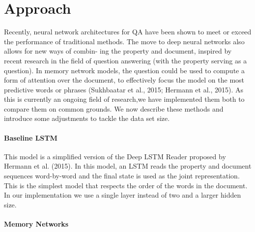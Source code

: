 \documentclass{article}
\begin{document}
\section{Approach}
\label{approach}

Recently, neural network architectures for QA have  been  shown  to  meet  or  exceed  the  performance of traditional methods. The  move  to  deep  neural
networks  also  allows  for  new  ways  of  combin-
ing the property and document, inspired by recent
research in the field of question answering (with the  property  serving  as  a  question).   In  memory network models,  the  question  could  be
used to compute a form of attention over the document, to effectively focus the model on the most predictive words or phrases (Sukhbaatar et al.,  2015;  Hermann et al.,  2015). As this is currently an ongoing field of research,we have implemented them both to compare them on common grounds. We  now  describe  these  methods and introduce some adjustments to tackle the data set size.

\paragraph{Baseline LSTM}

This model is a simplified version of the Deep LSTM Reader proposed by Hermann  et  al. (2015). In  this  model,  an  LSTM reads  the property and document sequences word-by-word and the final state is used as the joint representation.  This is the simplest model that respects the order of the words in the document. In our implementation we use a single layer instead of two and a larger hidden size.

\paragraph{Memory Networks}
\end{document}
